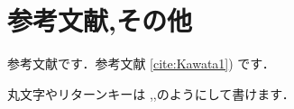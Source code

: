 
\section{参考文献,その他}
参考文献\cite{Kawata1,Schaft1,Nakamura1}です．参考文献 \ref{cite:Kawata1}) です．

丸文字やリターンキーは ,\returna,\returnb のようにして書けます．